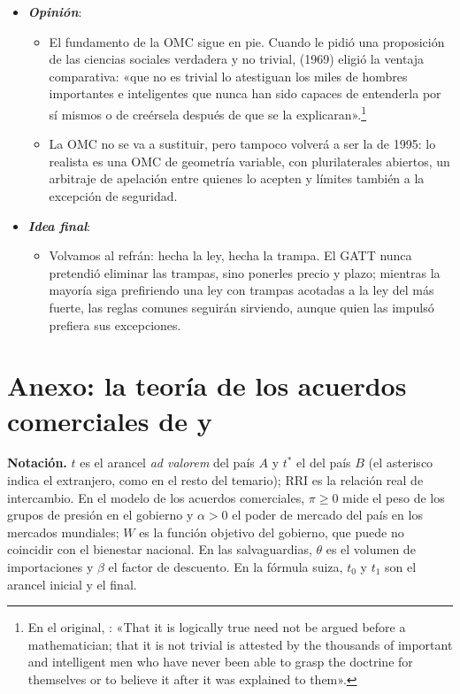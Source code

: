 \documentclass[11pt]{article}
\begin{document}
\begin{itemize}
\begin{itemize}
  \end{itemize}
\item \textbf{\emph{Opinión}}:
  \begin{itemize}
  \item El fundamento de la OMC sigue en pie. Cuando  le pidió una proposición de las ciencias sociales verdadera y no trivial,  (1969) eligió la ventaja comparativa: «que no es trivial lo atestiguan los miles de hombres importantes e inteligentes que nunca han sido capaces de entenderla por sí mismos o de creérsela después de que se la explicaran».\footnote{En el original, \textcite{Samuelson1969Way}: «That it is logically true need not be argued before a mathematician; that it is not trivial is attested by the thousands of important and intelligent men who have never been able to grasp the doctrine for themselves or to believe it after it was explained to them».}
  \item La OMC no se va a sustituir, pero tampoco volverá a ser la de 1995: lo realista es una OMC de geometría variable, con plurilaterales abiertos, un arbitraje de apelación entre quienes lo acepten y límites también a la excepción de seguridad.
  \end{itemize}
\item \textbf{\emph{Idea final}}:
  \begin{itemize}
  \item Volvamos al refrán: hecha la ley, hecha la trampa. El GATT nunca pretendió eliminar las trampas, sino ponerles precio y plazo; mientras la mayoría siga prefiriendo una ley con trampas acotadas a la ley del más fuerte, las reglas comunes seguirán sirviendo, aunque quien las impulsó prefiera sus excepciones.
  \end{itemize}
\end{itemize}

\clearpage
\appendix

\section{Anexo: la teoría de los acuerdos comerciales\cortetitulo{} de  y }\label{anexo:acuerdos}

\begin{anotaciones}
\textbf{Notación.} $t$ es el arancel \emph{ad valorem} del país $A$ y $t^*$ el del país $B$ (el asterisco indica el extranjero, como en el resto del temario); RRI es la relación real de intercambio. En el modelo de los acuerdos comerciales, $\pi\geq0$ mide el peso de los grupos de presión en el gobierno y $\alpha>0$ el poder de mercado del país en los mercados mundiales; $W$ es la función objetivo del gobierno, que puede no coincidir con el bienestar nacional. En las salvaguardias, $\theta$ es el volumen de importaciones y $\beta$ el factor de descuento. En la fórmula suiza, $t_0$ y $t_1$ son el arancel inicial y el final.
\end{anotaciones}
\end{document}
